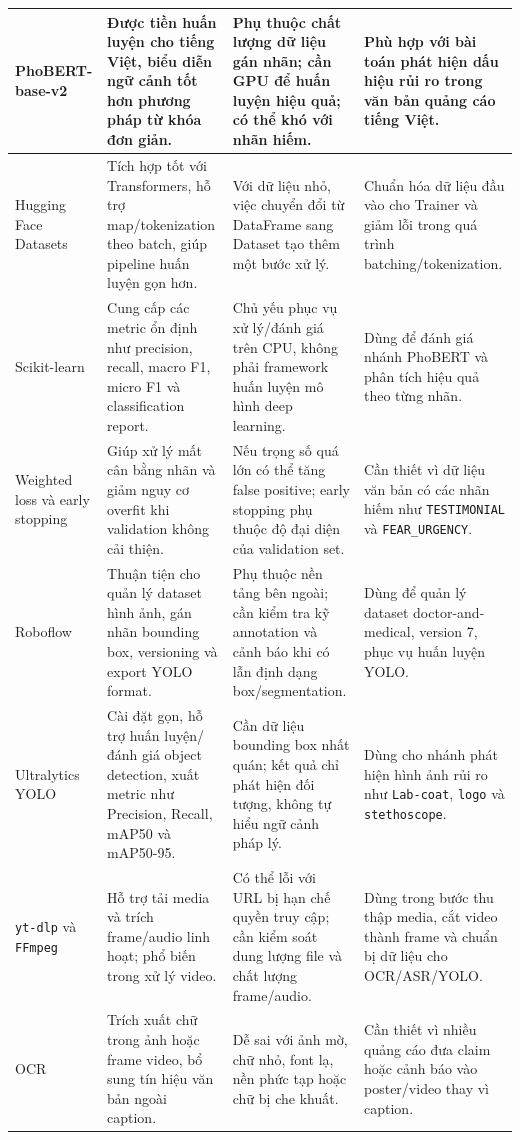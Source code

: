 {\begin{longtable}{|L{0.16\textwidth}|L{0.23\textwidth}|L{0.23\textwidth}|L{0.20\textwidth}|}
PhoBERT-base-v2 & Được tiền huấn luyện cho tiếng Việt, biểu diễn ngữ cảnh tốt hơn phương pháp từ khóa đơn giản. & Phụ thuộc chất lượng dữ liệu gán nhãn; cần GPU để huấn luyện hiệu quả; có thể khó với nhãn hiếm. & Phù hợp với bài toán phát hiện dấu hiệu rủi ro trong văn bản quảng cáo tiếng Việt. \\ \hline
Hugging Face Datasets & Tích hợp tốt với Transformers, hỗ trợ map/tokenization theo batch, giúp pipeline huấn luyện gọn hơn. & Với dữ liệu nhỏ, việc chuyển đổi từ DataFrame sang Dataset tạo thêm một bước xử lý. & Chuẩn hóa dữ liệu đầu vào cho Trainer và giảm lỗi trong quá trình batching/tokenization. \\ \hline
Scikit-learn & Cung cấp các metric ổn định như precision, recall, macro F1, micro F1 và classification report. & Chủ yếu phục vụ xử lý/đánh giá trên CPU, không phải framework huấn luyện mô hình deep learning. & Dùng để đánh giá nhánh PhoBERT và phân tích hiệu quả theo từng nhãn. \\ \hline
Weighted loss và early stopping & Giúp xử lý mất cân bằng nhãn và giảm nguy cơ overfit khi validation không cải thiện. & Nếu trọng số quá lớn có thể tăng false positive; early stopping phụ thuộc độ đại diện của validation set. & Cần thiết vì dữ liệu văn bản có các nhãn hiếm như \texttt{TESTIMONIAL} và \texttt{FEAR\_URGENCY}. \\ \hline
Roboflow & Thuận tiện cho quản lý dataset hình ảnh, gán nhãn bounding box, versioning và export YOLO format. & Phụ thuộc nền tảng bên ngoài; cần kiểm tra kỹ annotation và cảnh báo khi có lẫn định dạng box/segmentation. & Dùng để quản lý dataset doctor-and-medical, version 7, phục vụ huấn luyện YOLO. \\ \hline
Ultralytics YOLO & Cài đặt gọn, hỗ trợ huấn luyện/đánh giá object detection, xuất metric như Precision, Recall, mAP50 và mAP50-95. & Cần dữ liệu bounding box nhất quán; kết quả chỉ phát hiện đối tượng, không tự hiểu ngữ cảnh pháp lý. & Dùng cho nhánh phát hiện hình ảnh rủi ro như \texttt{Lab-coat}, \texttt{logo} và \texttt{stethoscope}. \\ \hline
\texttt{yt-dlp} và \texttt{FFmpeg} & Hỗ trợ tải media và trích frame/audio linh hoạt; phổ biến trong xử lý video. & Có thể lỗi với URL bị hạn chế quyền truy cập; cần kiểm soát dung lượng file và chất lượng frame/audio. & Dùng trong bước thu thập media, cắt video thành frame và chuẩn bị dữ liệu cho OCR/ASR/YOLO. \\ \hline
OCR & Trích xuất chữ trong ảnh hoặc frame video, bổ sung tín hiệu văn bản ngoài caption. & Dễ sai với ảnh mờ, chữ nhỏ, font lạ, nền phức tạp hoặc chữ bị che khuất. & Cần thiết vì nhiều quảng cáo đưa claim hoặc cảnh báo vào poster/video thay vì caption. \\ \hline

\end{longtable}}
